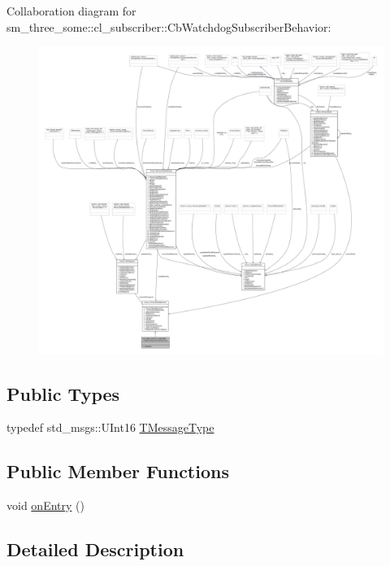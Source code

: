 Collaboration diagram for sm\+\_\+three\+\_\+some\+:\+:cl\+\_\+subscriber\+:\+:Cb\+Watchdog\+Subscriber\+Behavior\+:
\nopagebreak
\begin{figure}[H]
\begin{center}
\leavevmode
\includegraphics[width=350pt]{classsm__three__some_1_1cl__subscriber_1_1CbWatchdogSubscriberBehavior__coll__graph}
\end{center}
\end{figure}
\subsection*{Public Types}
\begin{DoxyCompactItemize}
\item 
typedef std\+\_\+msgs\+::\+U\+Int16 \hyperlink{classsm__three__some_1_1cl__subscriber_1_1CbWatchdogSubscriberBehavior_a2310463e68d0999f13ccc9f16ceaf3fe}{T\+Message\+Type}
\end{DoxyCompactItemize}
\subsection*{Public Member Functions}
\begin{DoxyCompactItemize}
\item 
void \hyperlink{classsm__three__some_1_1cl__subscriber_1_1CbWatchdogSubscriberBehavior_a6bd938abf54a95555182345a5e53cafe}{on\+Entry} ()
\end{DoxyCompactItemize}


\subsection{Detailed Description}



